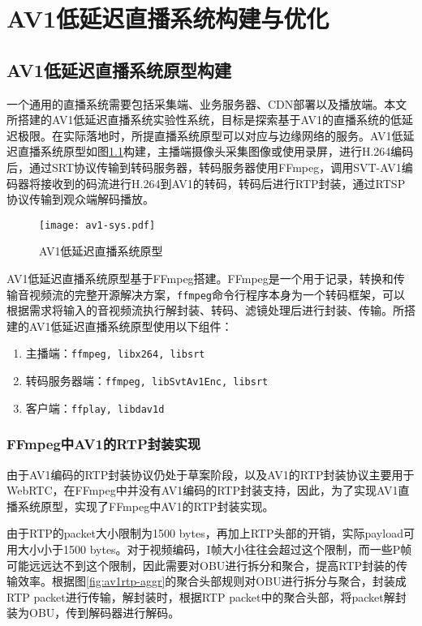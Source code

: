 \chapter{AV1低延迟直播系统构建与优化}

\section{AV1低延迟直播系统原型构建}
	一个通用的直播系统需要包括采集端、业务服务器、CDN部署以及播放端。本文所搭建的AV1低延迟直播系统实验性系统，目标是探索基于AV1的直播系统的低延迟极限。在实际落地时，所提直播系统原型可以对应与边缘网络的服务。AV1低延迟直播系统原型如图\ref{fig:av1-sys}构建，主播端摄像头采集图像或使用录屏，进行H.264编码后，通过SRT协议传输到转码服务器，转码服务器使用FFmpeg，调用SVT-AV1编码器将接收到的码流进行H.264到AV1的转码，转码后进行RTP封装，通过RTSP协议传输到观众端解码播放。

  \begin{figure}[!htp]
    \centering
    \texttt{[image: av1-sys.pdf]}
    \caption{AV1低延迟直播系统原型}
   \label{fig:av1-sys}
  \end{figure}

  AV1低延迟直播系统原型基于FFmpeg搭建。FFmpeg是一个用于记录，转换和传输音视频流的完整开源解决方案，\texttt{ffmpeg}命令行程序本身为一个转码框架，可以根据需求将输入的音视频流执行解封装、转码、滤镜处理后进行封装、传输。所搭建的AV1低延迟直播系统原型使用以下组件：
	\begin{enumerate} [label=\arabic*)]
		\item 主播端：\texttt{ffmpeg, libx264, libsrt}
		\item 转码服务器端：\texttt{ffmpeg, libSvtAv1Enc, libsrt}
		\item 客户端：\texttt{ffplay, libdav1d}
	\end{enumerate}

\subsection{FFmpeg中AV1的RTP封装实现}
	由于AV1编码的RTP封装协议\cite{RTPPayloadFormat}仍处于草案阶段，以及AV1的RTP封装协议主要用于WebRTC，在FFmpeg中并没有AV1编码的RTP封装支持，因此，为了实现AV1直播系统原型，实现了FFmpeg中AV1的RTP封装实现。

	由于RTP的packet大小限制为1500 bytes，再加上RTP头部的开销，实际payload可用大小小于1500 bytes。对于视频编码，I帧大小往往会超过这个限制，而一些P帧可能远远达不到这个限制，因此需要对OBU进行拆分和聚合，提高RTP封装的传输效率。根据图\ref{fig:av1rtp-aggr}的聚合头部规则对OBU进行拆分与聚合，封装成RTP packet进行传输，解封装时，根据RTP packet中的聚合头部，将packet解封装为OBU，传到解码器进行解码。

